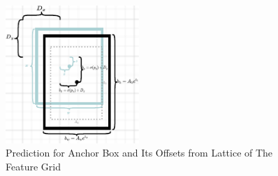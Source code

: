     \begin{figure}[t]
        \centering
        \includegraphics[width=0.45\textwidth]{figures/anchor.pdf}
        \caption{Prediction for Anchor Box and Its Offsets from Lattice of The Feature Grid }
        \label{fig:anchorbox}
    \end{figure}

  

